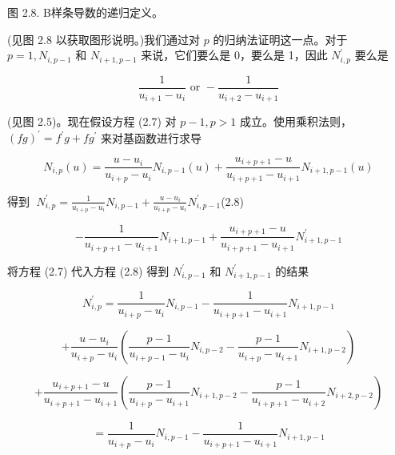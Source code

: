 \documentclass[../main.tex]{subfiles}
\begin{document}
\begin{center}
\begin{minipage}{18cm}
\vspace*{.6\baselineskip}
\centering
{}
\par\smallskip
图 2.8. B样条导数的递归定义。
\end{minipage}
\end{center}

(见图 2.8 以获取图形说明。)我们通过对 \(p\) 的归纳法证明这一点。对于 \(p = 1,{N}_{i,p - 1}\) 和 \({N}_{i + 1,p - 1}\) 来说，它们要么是 0，要么是 1，因此 \({N}_{i,p}^{\prime }\) 要么是

\[
\frac{1}{{u}_{i + 1} - {u}_{i}}\text{ or } - \frac{1}{{u}_{i + 2} - {u}_{i + 1}}
\]

(见图 2.5)。现在假设方程 (2.7) 对 \(p - 1,p > 1\) 成立。使用乘积法则， \({\left( fg\right) }^{\prime } = {f}^{\prime }g + f{g}^{\prime }\) 来对基函数进行求导

\[
{N}_{i,p}\left( u\right)  = \frac{u - {u}_{i}}{{u}_{i + p} - {u}_{i}}{N}_{i,p - 1}\left( u\right)  + \frac{{u}_{i + p + 1} - u}{{u}_{i + p + 1} - {u}_{i + 1}}{N}_{i + 1,p - 1}\left( u\right)
\]

得到 \(\;{N}_{i,p}^{\prime } = \frac{1}{{u}_{i + p} - {u}_{i}}{N}_{i,p - 1} + \frac{u - {u}_{i}}{{u}_{i + p} - {u}_{i}}{N}_{i,p - 1}^{\prime }\)(2.8)

\[
- \frac{1}{{u}_{i + p + 1} - {u}_{i + 1}}{N}_{i + 1,p - 1} + \frac{{u}_{i + p + 1} - u}{{u}_{i + p + 1} - {u}_{i + 1}}{N}_{i + 1,p - 1}^{\prime }
\]




将方程 (2.7) 代入方程 (2.8) 得到 \({N}_{i,p - 1}^{\prime }\) 和 \({N}_{i + 1,p - 1}^{\prime }\) 的结果

\[
{N}_{i,p}^{\prime } = \frac{1}{{u}_{i + p} - {u}_{i}}{N}_{i,p - 1} - \frac{1}{{u}_{i + p + 1} - {u}_{i + 1}}{N}_{i + 1,p - 1}
\]

\[
+ \frac{u - {u}_{i}}{{u}_{i + p} - {u}_{i}}\left( {\frac{p - 1}{{u}_{i + p - 1} - {u}_{i}}{N}_{i,p - 2} - \frac{p - 1}{{u}_{i + p} - {u}_{i + 1}}{N}_{i + 1,p - 2}}\right)
\]

\[
+ \frac{{u}_{i + p + 1} - u}{{u}_{i + p + 1} - {u}_{i + 1}}\left( {\frac{p - 1}{{u}_{i + p} - {u}_{i + 1}}{N}_{i + 1,p - 2} - \frac{p - 1}{{u}_{i + p + 1} - {u}_{i + 2}}{N}_{i + 2,p - 2}}\right)
\]

\[
= \frac{1}{{u}_{i + p} - {u}_{i}}{N}_{i,p - 1} - \frac{1}{{u}_{i + p + 1} - {u}_{i + 1}}{N}_{i + 1,p - 1}
\]
\end{document}
